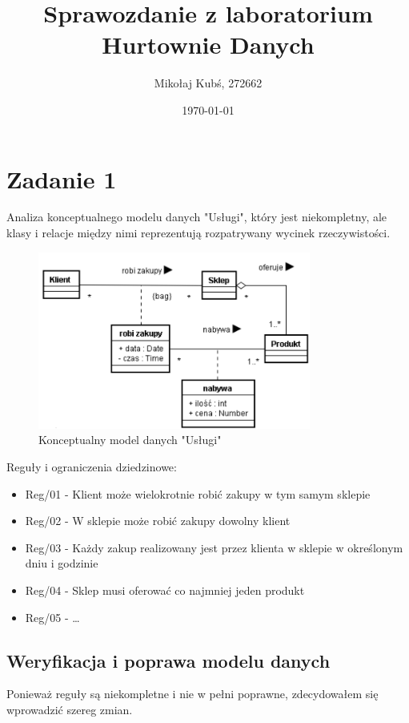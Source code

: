 \documentclass[a4paper,12pt]{article}
\title{Sprawozdanie z laboratorium Hurtownie Danych}
\author{Mikołaj Kubś, 272662}
\date{\today}
\begin{document}
\maketitle

\section{Zadanie 1}
Analiza konceptualnego modelu danych "Usługi", który jest niekompletny,
ale klasy i relacje między nimi reprezentują rozpatrywany wycinek rzeczywistości. 

\begin{figure}[H]
\centering
\includegraphics[width=0.8\textwidth]{images/old.png}
\caption{Konceptualny model danych "Usługi"}
\label{fig:uslugi}
\end{figure}

Reguły i ograniczenia dziedzinowe:
\begin{itemize}
    \item Reg/01 - Klient może wielokrotnie robić zakupy w tym samym sklepie
    \item Reg/02 - W sklepie może robić zakupy dowolny klient
    \item Reg/03 - Każdy zakup realizowany jest przez klienta w sklepie w określonym dniu i godzinie
    \item Reg/04 - Sklep musi oferować co najmniej jeden produkt
    \item Reg/05 - \ldots
\end{itemize}

\subsection{Weryfikacja i poprawa modelu danych}

Ponieważ reguły są niekompletne i nie w pełni poprawne, zdecydowałem się wprowadzić szereg zmian. 
\end{document}

